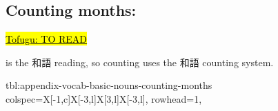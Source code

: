 \documentclass[../nihongo-gakushuu-kyouzai-supplementary.tex]{subfiles}
\begin{document}
\subsection{Counting months: }
\href{https://www.tofugu.com/japanese/japanese-counter-tsuki-gatsu-getsu/}{\hl{Tofugu: TO READ}}

 is the 和語 reading, so counting uses the 和語 counting system.

{tbl:appendix-vocab-basic-nouns-counting-months}  %
{}  %
{
    colspec={X[-1,c]X[-3,l]X[3,l]X[-3,l]},
    rowhead=1,
}  %
\end{document}
